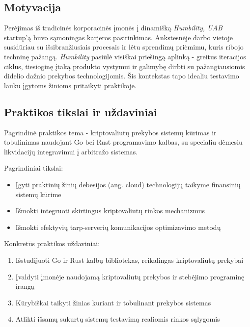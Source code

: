 \documentclass[]{VUMIFTemplateClass}
\begin{document}

\onehalfspacing



\singlespacing

\tableofcontents
\onehalfspacing


\subsection*{Motyvacija}
Perėjimas iš tradicinės korporacinės įmonės į dinamišką \textit{Humbility, UAB} startup'ą buvo sąmoningas karjeros pasirinkimas. Ankstesnėje darbo vietoje susidūriau su išsibranžiusiais procesais ir lėtu sprendimų priėmimu, kuris ribojo techninę pažangą. \textit{Humbility} pasiūlė visiškai priešingą aplinką - greitus iteracijos ciklus, tiesioginę įtaką produkto vystymui ir galimybę dirbti su pažangiausiomis didelio dažnio prekybos technologijomis. Šis kontekstas tapo idealiu testavimo lauku įgytoms žinioms pritaikyti praktikoje.

\subsection*{Praktikos tikslai ir uždaviniai}
Pagrindinė praktikos tema - kriptovaliutų prekybos sistemų kūrimas ir tobulinimas naudojant Go bei Rust programavimo kalbas, su specialiu dėmesiu likvidacijų integravimui į arbitražo sistemas.

Pagrindiniai tikslai:
\begin{itemize}
\item Įgyti praktinių žinių debesijos (ang. cloud) technologijų taikyme finansinių sistemų kūrime
\item Išmokti integruoti skirtingus kriptovaliutų rinkos mechanizmus
\item Išmokti efektyvių tarp-serverių komunikacijos optimizavimo metodų
\end{itemize}

Konkretūs praktikos uždaviniai:
\begin{enumerate}
\item Išstudijuoti Go ir Rust kalbų bibliotekas, reikalingas kriptovaliutų prekybai
\item Įvaldyti įmonėje naudojamą kriptovaliutų prekybos ir stebėjimo programinę įrangą
\item Kūrybiškai taikyti žinias kuriant ir tobulinant prekybos sistemas
\item Atlikti išsamų sukurtų sistemų testavimą realiomis rinkos sąlygomis
\end{enumerate}
\end{document}
